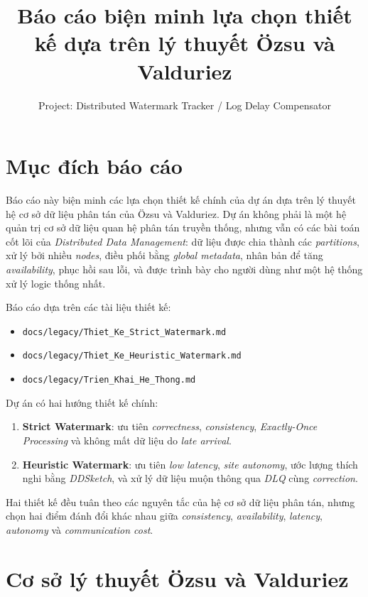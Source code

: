 \documentclass[12pt,a4paper]{article}
\title{Báo cáo biện minh lựa chọn thiết kế dựa trên lý thuyết Özsu và Valduriez}
\author{Project: Distributed Watermark Tracker / Log Delay Compensator}
\date{}
\begin{document}
\maketitle

\section{Mục đích báo cáo}

Báo cáo này biện minh các lựa chọn thiết kế chính của dự án dựa trên lý thuyết hệ cơ sở dữ liệu phân tán của Özsu và Valduriez. Dự án không phải là một hệ quản trị cơ sở dữ liệu quan hệ phân tán truyền thống, nhưng vẫn có các bài toán cốt lõi của \textit{Distributed Data Management}: dữ liệu được chia thành các \textit{partitions}, xử lý bởi nhiều \textit{nodes}, điều phối bằng \textit{global metadata}, nhân bản để tăng \textit{availability}, phục hồi sau lỗi, và được trình bày cho người dùng như một hệ thống xử lý logic thống nhất.

Báo cáo dựa trên các tài liệu thiết kế:

\begin{itemize}
    \item \texttt{docs/legacy/Thiet\_Ke\_Strict\_Watermark.md}
    \item \texttt{docs/legacy/Thiet\_Ke\_Heuristic\_Watermark.md}
    \item \texttt{docs/legacy/Trien\_Khai\_He\_Thong.md}
\end{itemize}

Dự án có hai hướng thiết kế chính:

\begin{enumerate}
    \item \textbf{Strict Watermark}: ưu tiên \textit{correctness}, \textit{consistency}, \textit{Exactly-Once Processing} và không mất dữ liệu do \textit{late arrival}.
    \item \textbf{Heuristic Watermark}: ưu tiên \textit{low latency}, \textit{site autonomy}, ước lượng thích nghi bằng \textit{DDSketch}, và xử lý dữ liệu muộn thông qua \textit{DLQ} cùng \textit{correction}.
\end{enumerate}

Hai thiết kế đều tuân theo các nguyên tắc của hệ cơ sở dữ liệu phân tán, nhưng chọn hai điểm đánh đổi khác nhau giữa \textit{consistency}, \textit{availability}, \textit{latency}, \textit{autonomy} và \textit{communication cost}.

\section{Cơ sở lý thuyết Özsu và Valduriez}
\end{document}
